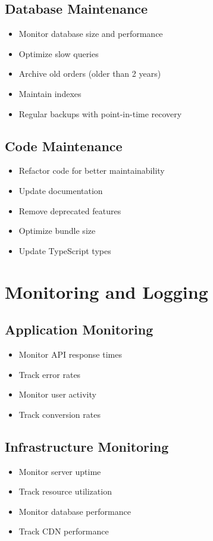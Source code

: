 \documentclass{scrreprt}
\begin{document}
\subsection{Database Maintenance}
\begin{itemize}
\item Monitor database size and performance
\item Optimize slow queries
\item Archive old orders (older than 2 years)
\item Maintain indexes
\item Regular backups with point-in-time recovery
\end{itemize}

\subsection{Code Maintenance}
\begin{itemize}
\item Refactor code for better maintainability
\item Update documentation
\item Remove deprecated features
\item Optimize bundle size
\item Update TypeScript types
\end{itemize}

\section{Monitoring and Logging}

\subsection{Application Monitoring}
\begin{itemize}
\item Monitor API response times
\item Track error rates
\item Monitor user activity
\item Track conversion rates
\end{itemize}

\subsection{Infrastructure Monitoring}
\begin{itemize}
\item Monitor server uptime
\item Track resource utilization
\item Monitor database performance
\item Track CDN performance
\end{itemize}
\end{document}

